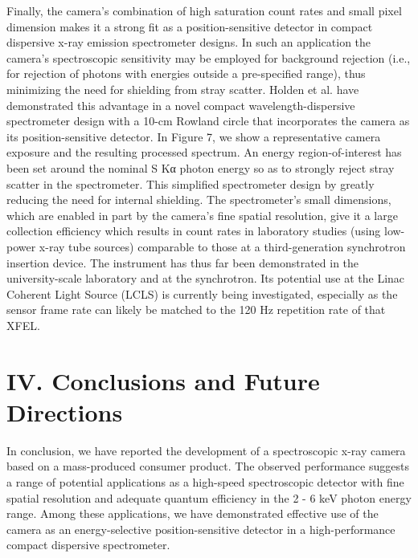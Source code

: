 \FloatBarrier

Finally, the camera's combination of high saturation count rates and
small pixel dimension makes it a strong fit as a position-sensitive
detector in compact dispersive x-ray emission spectrometer designs. In
such an application the camera's spectroscopic sensitivity may be
employed for background rejection (i.e., for rejection of photons with
energies outside a pre-specified range), thus minimizing the need for
shielding from stray scatter. Holden et al. have demonstrated this
advantage in a novel compact wavelength-dispersive spectrometer design
with a 10-cm Rowland circle that incorporates the camera as its
position-sensitive detector.\cite{holden2017compact} In Figure 7, we show a
representative camera exposure and the resulting processed spectrum. An
energy region-of-interest has been set around the nominal S Kα photon
energy so as to strongly reject stray scatter in the spectrometer. This
simplified spectrometer design by greatly reducing the need for internal
shielding. The spectrometer's small dimensions, which are enabled in
part by the camera's fine spatial resolution, give it a large collection
efficiency which results in count rates in laboratory studies (using
low-power x-ray tube sources) comparable to those at a third-generation
synchrotron insertion device. The instrument has thus far been
demonstrated in the university-scale laboratory and at the synchrotron.
Its potential use at the Linac Coherent Light Source (LCLS) is currently
being investigated, especially as the sensor frame rate can likely be
matched to the 120 Hz repetition rate of that XFEL.

\section{IV. Conclusions and Future Directions}

In conclusion, we have reported the development of a spectroscopic x-ray
camera based on a mass-produced consumer product. The observed
performance suggests a range of potential applications as a high-speed
spectroscopic detector with fine spatial resolution and adequate quantum
efficiency in the 2 - 6 keV photon energy range. Among these
applications, we have demonstrated effective use of the camera as an
energy-selective position-sensitive detector in a high-performance
compact dispersive spectrometer.

